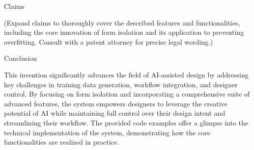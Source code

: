 \documentclass{article}
\begin{document}
Claims

(Expand claims to thoroughly cover the described features and functionalities, including the core innovation of form isolation and its application to preventing overfitting. Consult with a patent attorney for precise legal wording.)

Conclusion

This invention significantly advances the field of AI-assisted design by addressing key challenges in training data generation, workflow integration, and designer control. By focusing on form isolation and incorporating a comprehensive suite of advanced features, the system empowers designers to leverage the creative potential of AI while maintaining full control over their design intent and streamlining their workflow. The provided code examples offer a glimpse into the technical implementation of the system, demonstrating how the core functionalities are realized in practice. 
\end{document}
